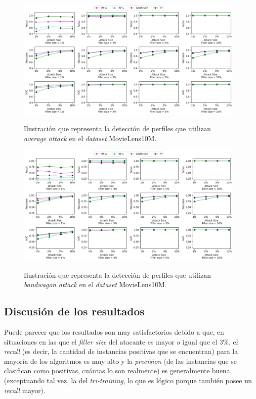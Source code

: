 \begin{figure}[h]
	\caption[\textit{Average attack}: detección.]{Ilustración que representa la detección de perfiles que utilizan \textit{average attack} en el \textit{dataset} MovieLens10M.}
	\centering
	\includegraphics[scale=0.44]{../img/memoria/5_resultados_average_attack}
	\label{5_average_attack}
\end{figure}

\begin{figure}[h]
	\caption[\textit{Bandwagon attack}: detección.]{Ilustración que representa la detección de perfiles que utilizan \textit{bandwagon attack} en el \textit{dataset} MovieLens10M.}
	\centering
	\includegraphics[scale=0.44]{../img/memoria/5_resultados_bandwagon_attack}
	\label{5_bandwagon_attack}
\end{figure}

\subsection{Discusión de los resultados}

Puede parecer que los resultados son muy satisfactorios debido a que, en situaciones en las que el \textit{filler size} del atacante es mayor o igual que el $3\%$, el \textit{recall} (es decir, la cantidad de instancias positivas que se encuentran) para la mayoría de los algoritmos es muy alto y la \textit{precision} (de las instancias que se clasifican como positivas, cuántas lo son realmente) es generalmente buena (exceptuando tal vez, la del \textit{tri-training}, lo que es lógico porque también posee un \textit{recall} mayor).

